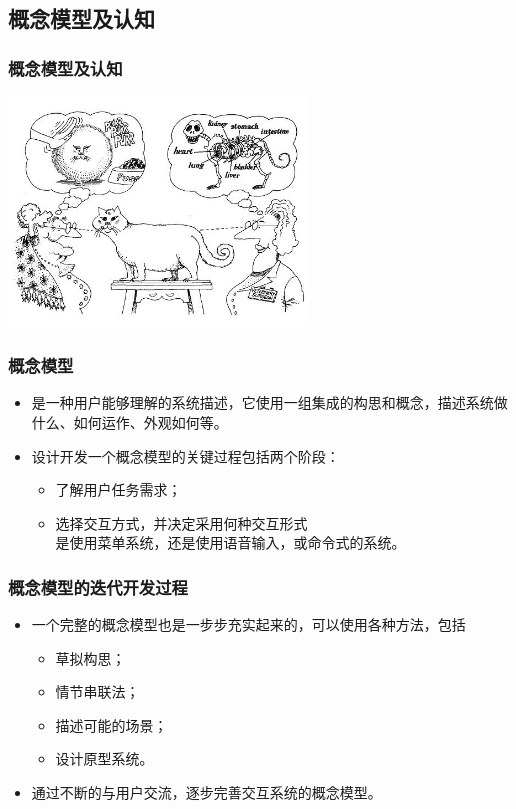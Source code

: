 \documentclass{beamer}
\begin{document}
\subsection{概念模型及认知}
\begin{frame}
	\frametitle{概念模型及认知}
	\begin{center}
		\includegraphics[width=8cm]{images/viewpoint.jpg}
	\end{center}
\end{frame}

\begin{frame}
	\frametitle{概念模型}
	\beamertemplatetransparentcovereddynamicmedium
	\begin{itemize}
		\item 是一种用户能够理解的系统描述，它使用一组集成的构思和概念，描述系统做什么、如何运作、外观如何等。\pause
		\item 设计开发一个概念模型的关键过程包括两个阶段：
		\begin{itemize}
			\item 了解用户任务需求；
			\item 选择交互方式，并决定采用何种交互形式\\{\tiny 是使用菜单系统，还是使用语音输入，或命令式的系统。}
		\end{itemize}
	\end{itemize}
\end{frame}

\begin{frame}
	\frametitle{概念模型的迭代开发过程}
	\beamertemplatetransparentcovereddynamicmedium
	\begin{itemize}
		\item 一个完整的概念模型也是一步步充实起来的，可以使用各种方法，包括
		\begin{itemize}
			\item 草拟构思；
			\item 情节串联法；
			\item 描述可能的场景；
			\item 设计原型系统。
		\end{itemize}\pause
		\item 通过不断的与用户交流，逐步完善交互系统的概念模型。
	\end{itemize}
\end{frame}
\end{document}
